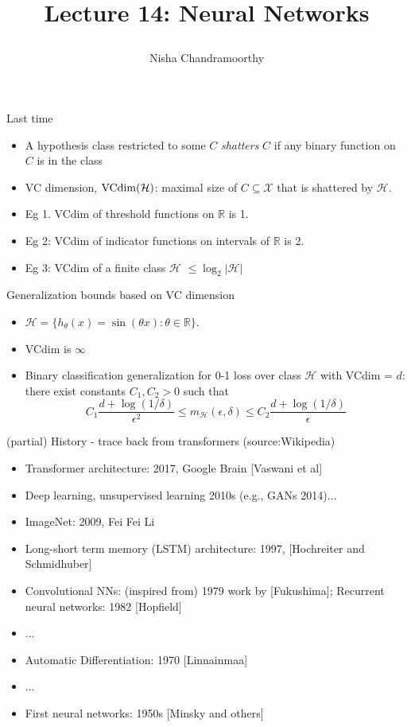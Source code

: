 \documentclass[final]{beamer}
\title{\begin{huge}{Lecture 14: Neural Networks}\end{huge}} %
\author{Nisha Chandramoorthy} %
\begin{document}
\frame{\titlepage}

\begin{frame}{Last time}
	\begin{itemize}
		\item A hypothesis class restricted to some $C$ \emph{shatters} $C$ if any binary function on $C$ is in the class
		\pause
		\item VC dimension, ${\rm VCdim}(\mathcal{H})$: maximal size of $C \subseteq \mathcal{X}$ that is shattered by $\mathcal{H}.$ 
		\pause
		\item Eg 1. VCdim of threshold functions on $\mathbb{R}$ is 1.
		\pause
		\item Eg 2: VCdim of indicator functions on intervals of $\mathbb{R}$ is 2.
		\pause
		\item Eg 3: VCdim of a finite class $\mathcal{H}$ $\leq \log_2|\mathcal{H}|$ 
	\end{itemize}
\end{frame}
\begin{frame}{Generalization bounds based on VC dimension}
	\begin{itemize}
		\item $\mathcal{H} = \{h_\theta(x) = \sin(\theta x): \theta \in \mathbb{R}\}$.
		\pause
		\item VCdim is $\infty$
		\pause 
	\item Binary classification generalization for 0-1 loss over class $\mathcal{H}$ with VCdim = $d$: there exist constants $C_1, C_2 > 0$ such that 
		$$ C_1 \dfrac{d + \log(1/\delta)}{\epsilon^2} \leq m_{\mathcal{H}}(\epsilon, \delta) \leq C_2 \dfrac{d + \log(1/\delta)}{\epsilon}$$
	
	\end{itemize}

\end{frame}
\begin{frame}{(partial) History - trace back from transformers (source:Wikipedia)}
	\begin{itemize}
		\item Transformer architecture: 2017, Google Brain [Vaswani et al]
		\item Deep learning, unsupervised learning 2010s (e.g., GANs 2014)...
		\item ImageNet: 2009, Fei Fei Li 
		\item Long-short term memory (LSTM) architecture: 1997, [Hochreiter and Schmidhuber]
		\item Convolutional NNs: (inspired from) 1979 work by [Fukushima];  Recurrent neural networks: 1982 [Hopfield]
		\item ...
		\item Automatic Differentiation: 1970 [Linnainmaa]
		\item ...
		\item First neural networks: 1950s [Minsky and others]
	\end{itemize}
\end{frame}
\end{document}
